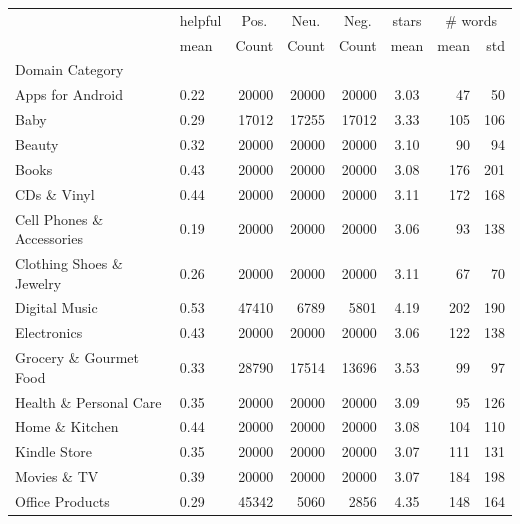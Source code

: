 \begin{table}	
	\begin{tabularx}{\textwidth}{lXrrrcrr}
		
		\toprule
		{} & helpful & \multicolumn{1}{c}{Pos.} & \multicolumn{1}{c}{Neu.} & \multicolumn{1}{c}{Neg.} &\multicolumn{1}{c}{stars} & \multicolumn{2}{c}{\# words} \\
		{} &         					mean &   	Count & Count & Count &  mean 	&  mean  &     std \\
		Domain Category             &        &            &       &       &       	&    	 &         \\
		\midrule
		Apps for Android            &   0.22 &   20000 &  	20000 & 20000 &    3.03 &     47 &   50 \\
		Baby                        &   0.29 & 	17012 &  	17255 &  	17012 &    3.33 &    105 &  106 \\
		Beauty                      &   0.32 &   20000 &  	20000 & 20000 &    3.10 &     90 &   94 \\
		Books                       &   0.43 &   20000 &  	20000 & 20000 &    3.08 &    176 &  201 \\
		CDs \& Vinyl                &   0.44 &   20000 &  	20000 & 20000 &    3.11 &    172 &  168 \\
		Cell Phones \& Accessories  &   0.19 &   20000 &  	20000 & 20000 &    3.06 &     93 &  138 \\
		Clothing Shoes \& Jewelry   &   0.26&   20000 &  	20000 & 20000 &    3.11 &     67 &   70 \\
		Digital Music               &   0.53 &  47410 &  	6789 &  5801 &    4.19 &    202 &  190 \\
		Electronics                 &   0.43 &   20000 &  	20000 & 20000 &    3.06 &    122 &  138 \\
		Grocery \& Gourmet Food     &   0.33 &  28790 & 17514 & 13696 &    3.53 &    99  &   97 \\
		Health \& Personal Care     &   0.35 &   20000 &  	20000 & 20000 &    3.09 &     95 &  126 \\
		Home \& Kitchen             &   0.44 &   20000 &  	20000 & 20000 &    3.08 &    104 &  110 \\
		Kindle Store                &   0.35 &   20000 &  	20000 & 20000 &    3.07 &    111 &  131 \\
		Movies \& TV                &   0.39 &   20000 &  	20000 & 20000 &    3.07 &    184 &  198 \\
		Office Products             &   0.29 &  45342 &  5060 & 2856 &    4.35 &    148 &  164 \\

\end{tabularx}
\end{table}
